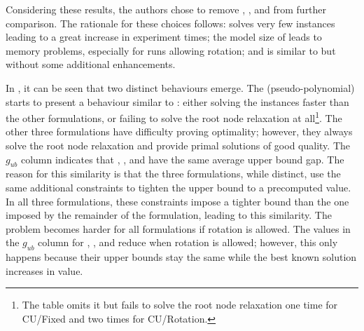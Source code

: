 Considering these results, the authors chose to remove {\modelBCE}, {\modelGrid}, and {\modelFMT} from further comparison.
The rationale for these choices follows: {\modelBCE} solves very few instances leading to a great increase in experiment times; the model size of {\modelGrid} leads to memory problems, especially for runs allowing rotation; and {\modelFMT} is similar to {\modelBecker} but without some additional enhancements.

In , it can be seen that two distinct behaviours emerge.
The {\modelBecker} (pseudo-polynomial) starts to present a behaviour similar to {\modelFMT}: either solving the instances faster than the other formulations, or failing to solve the root node relaxation at all\footnote{The table omits it but {\modelBecker} fails to solve the root node relaxation one time for CU/Fixed and two times for CU/Rotation.}.
The other three formulations have difficulty proving optimality; however, they always solve the root node relaxation and provide primal solutions of good quality.
The \(g_{ub}\) column indicates that {\modelHierarchical}, {\modelImplicit}, and {\modelOrigami} have the same average upper bound gap.
The reason for this similarity is that the three formulations, while distinct, use the same additional constraints to tighten the upper bound to a precomputed value.
In all three formulations, these constraints impose a tighter bound than the one imposed by the remainder of the formulation, leading to this similarity.
The problem becomes harder for all formulations if rotation is allowed.
The values in the \(g_{ub}\) column for {\modelHierarchical}, {\modelImplicit}, and {\modelOrigami} reduce when rotation is allowed; however, this only happens because their upper bounds stay the same while the best known solution increases in value.

